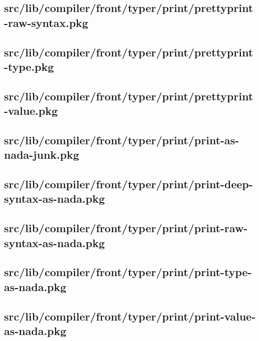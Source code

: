 \subsection{src/lib/compiler/front/typer/print/prettyprint-raw-syntax.pkg}


\subsection{src/lib/compiler/front/typer/print/prettyprint-type.pkg}


\subsection{src/lib/compiler/front/typer/print/prettyprint-value.pkg}


\subsection{src/lib/compiler/front/typer/print/print-as-nada-junk.pkg}


\subsection{src/lib/compiler/front/typer/print/print-deep-syntax-as-nada.pkg}


\subsection{src/lib/compiler/front/typer/print/print-raw-syntax-as-nada.pkg}


\subsection{src/lib/compiler/front/typer/print/print-type-as-nada.pkg}


\subsection{src/lib/compiler/front/typer/print/print-value-as-nada.pkg}


